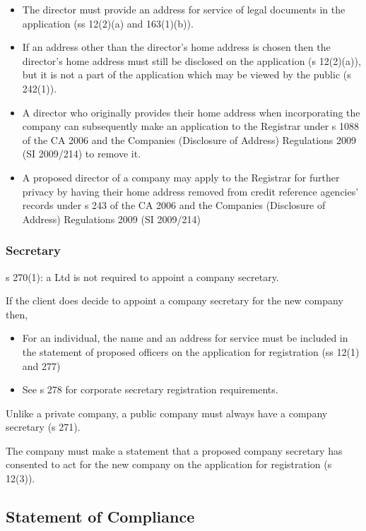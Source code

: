\documentclass[
]{article}
\providecommand{\tightlist}{%
  \setlength{\itemsep}{0pt}\setlength{\parskip}{0pt}}
\begin{document}
\begin{itemize}
\tightlist
\item
  The director must provide an address for service of legal documents in
  the application (ss 12(2)(a) and 163(1)(b)).
\item
  If an address other than the director's home address is chosen then
  the director's home address must still be disclosed on the application
  (s 12(2)(a)), but it is not a part of the application which may be
  viewed by the public (s 242(1)).
\item
  A director who originally provides their home address when
  incorporating the company can subsequently make an application to the
  Registrar under s 1088 of the CA 2006 and the Companies (Disclosure of
  Address) Regulations 2009 (SI 2009/214) to remove it.
\item
  A proposed director of a company may apply to the Registrar for
  further privacy by having their home address removed from credit
  reference agencies' records under s 243 of the CA 2006 and the
  Companies (Disclosure of Address) Regulations 2009 (SI 2009/214)
\end{itemize}

\hypertarget{secretary}{%
\subsubsection{Secretary}\label{secretary}}

s 270(1): a Ltd is not required to appoint a company secretary.

If the client does decide to appoint a company secretary for the new
company then,

\begin{itemize}
\tightlist
\item
  For an individual, the name and an address for service must be
  included in the statement of proposed officers on the application for
  registration (ss 12(1) and 277)
\item
  See s 278 for corporate secretary registration requirements.
\end{itemize}

Unlike a private company, a public company must always have a company
secretary (s 271).

The company must make a statement that a proposed company secretary has
consented to act for the new company on the application for registration
(s 12(3)).

\hypertarget{statement-of-compliance}{%
\subsection{Statement of Compliance}\label{statement-of-compliance}}
\end{document}
